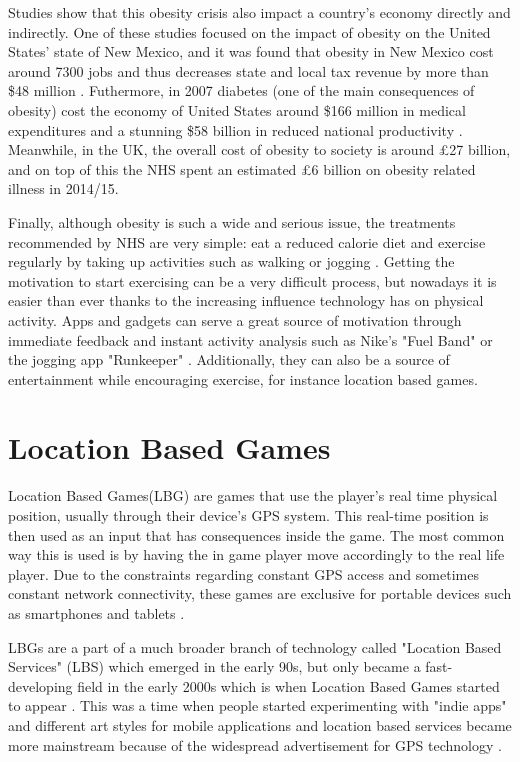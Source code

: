 \documentclass{dissertation}
\begin{document}
Studies show that this obesity crisis also impact a country's economy directly and indirectly. One of these studies focused on the impact of obesity 
on the United States' state of New Mexico, and it was found that obesity in New Mexico cost around 7300 jobs and thus decreases state and local tax 
revenue by more than \$48 million \citep{Frezza08}. Futhermore, in 2007 diabetes (one of the main consequences of obesity) cost the economy of United States 
around \$166 million in medical expenditures and a stunning \$58 billion in reduced national productivity \citep{Frezza08}. Meanwhile, in the UK, the 
overall cost of obesity to society is around £27 billion, and on top of this the NHS spent an estimated £6 billion on obesity related illness in 2014/15.

Finally, although obesity is such a wide and serious issue, the treatments recommended by NHS are very simple: eat a reduced calorie diet and 
exercise regularly by taking up activities such as walking or jogging \citep{NHS19}. Getting the motivation to start exercising can be a very 
difficult process, but nowadays it is easier than ever thanks to the increasing influence technology has on physical activity. Apps and gadgets can 
serve a great source of motivation through immediate feedback and instant activity analysis such as Nike's "Fuel Band" or the jogging app "Runkeeper" \citep{Bice15}.
Additionally, they can also be a source of entertainment while encouraging exercise, for instance location based games.

\section{Location Based Games}

Location Based Games(LBG) are games that use the player's real time physical position, usually through their device's GPS system. This real-time position 
is then used as an input that has consequences inside the game. The most common way this is used is by having the in game player move accordingly to 
the real life player. Due to the constraints regarding constant GPS access and sometimes constant network connectivity, these games are exclusive for 
portable devices such as smartphones and tablets \citep{Jacob10}.

LBGs are a part of a much broader branch of technology called "Location Based Services" (LBS) which emerged in the early 90s, 
but only became a fast-developing field in the early 2000s which is when Location Based Games started to appear \citep{Huang18}. This was a time when 
people started experimenting with "indie apps" and different art styles for mobile applications \citep{Leorke19} and location based services became more 
mainstream because of the widespread advertisement for GPS technology \citep{Gordon11}.
\end{document}
